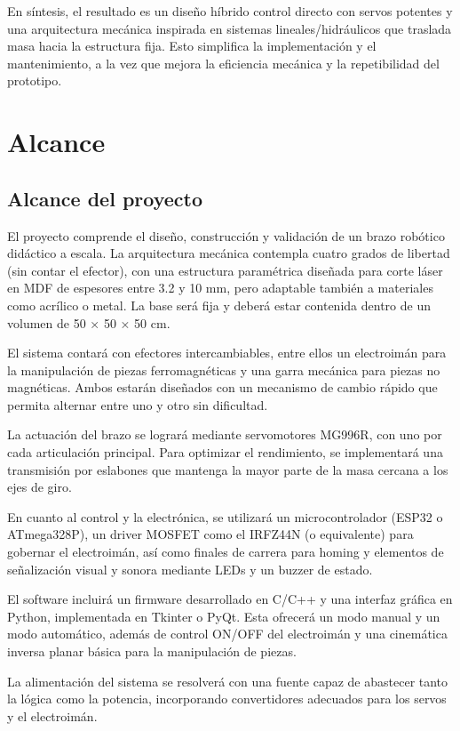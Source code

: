En síntesis, el resultado es un diseño híbrido control directo con servos potentes y una arquitectura mecánica inspirada en sistemas lineales/hidráulicos que traslada masa hacia la estructura fija. 
Esto simplifica la implementación y el mantenimiento, a la vez que mejora la eficiencia mecánica y la repetibilidad del prototipo.

\newpage
\section{Alcance}

\subsection{Alcance del proyecto}
El proyecto comprende el diseño, construcción y validación de un brazo robótico didáctico a escala. La arquitectura mecánica contempla cuatro grados de libertad (sin contar el efector), con una estructura paramétrica diseñada para corte láser en MDF de espesores entre 3.2 y 10 mm, pero adaptable también a materiales como acrílico o metal. La base será fija y deberá estar contenida dentro de un volumen de 50 × 50 × 50 cm.

El sistema contará con efectores intercambiables, entre ellos un electroimán para la manipulación de piezas ferromagnéticas y una garra mecánica para piezas no magnéticas. Ambos estarán diseñados con un mecanismo de cambio rápido que permita alternar entre uno y otro sin dificultad.

La actuación del brazo se logrará mediante servomotores MG996R, con uno por cada articulación principal. Para optimizar el rendimiento, se implementará una transmisión por eslabones que mantenga la mayor parte de la masa cercana a los ejes de giro.

En cuanto al control y la electrónica, se utilizará un microcontrolador (ESP32 o ATmega328P), un driver MOSFET como el IRFZ44N (o equivalente) para gobernar el electroimán, así como finales de carrera para homing y elementos de señalización visual y sonora mediante LEDs y un buzzer de estado.

El software incluirá un firmware desarrollado en C/C++ y una interfaz gráfica en Python, implementada en Tkinter o PyQt. Esta ofrecerá un modo manual y un modo automático, además de control ON/OFF del electroimán y una cinemática inversa planar básica para la manipulación de piezas.

La alimentación del sistema se resolverá con una fuente capaz de abastecer tanto la lógica como la potencia, incorporando convertidores adecuados para los servos y el electroimán.

